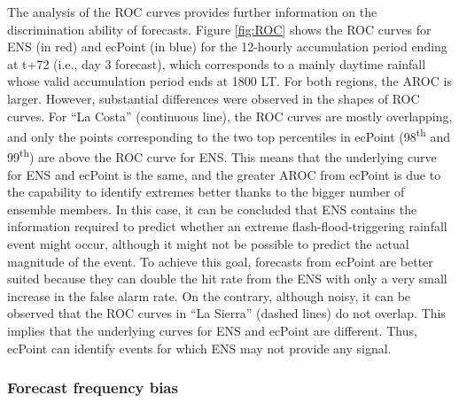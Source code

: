 \documentclass[techmemo]{ecmwfrep}%
\begin{document}
The analysis of the ROC curves provides further information on the discrimination ability of forecasts. Figure \ref{fig:ROC} shows the ROC curves for ENS (in red) and ecPoint (in blue) for the 12-hourly accumulation period ending at t+72 (i.e., day 3 forecast), which corresponds to a mainly daytime rainfall whose valid accumulation period ends at 1800 LT. For both regions, the AROC is larger. However, substantial differences were observed in the shapes of ROC curves. For “La Costa” (continuous line), the ROC curves are mostly overlapping, and only the points corresponding to the two top percentiles in ecPoint (98\textsuperscript{th} and 99\textsuperscript{th}) are above the ROC curve for ENS. This means that the underlying curve for ENS and ecPoint is the same, and the greater AROC from ecPoint is due to the capability to identify extremes better thanks to the bigger number of ensemble members. In this case, it can be concluded that ENS contains the information required to predict whether an extreme flash-flood-triggering rainfall event might occur, although it might not be possible to predict the actual magnitude of the event. To achieve this goal, forecasts from ecPoint are better suited because they can double the hit rate from the ENS with only a very small increase in the false alarm rate. On the contrary, although noisy, it can be observed that the ROC curves in “La Sierra” (dashed lines) do not overlap. This implies that the underlying curves for ENS and ecPoint are different. Thus, ecPoint can identify events for which ENS may not provide any signal.  

\subsubsection{Forecast frequency bias}
\end{document}
